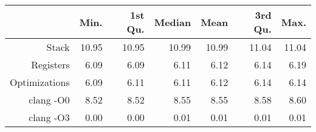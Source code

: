\begin{table}[ht]
\centering
\begin{tabular}{rrrrrrr}
  \hline
 & Min. & 1st Qu. & Median & Mean & 3rd Qu. & Max. \\ 
  \hline
Stack & 10.95 & 10.95 & 10.99 & 10.99 & 11.04 & 11.04 \\ 
  Registers & 6.09 & 6.09 & 6.11 & 6.12 & 6.14 & 6.19 \\ 
  Optimizations & 6.09 & 6.11 & 6.11 & 6.12 & 6.14 & 6.14 \\ 
  clang -O0 & 8.52 & 8.52 & 8.55 & 8.55 & 8.58 & 8.60 \\ 
  clang -O3 & 0.00 & 0.00 & 0.01 & 0.01 & 0.01 & 0.01 \\ 
   \hline
\end{tabular}
\end{table}
